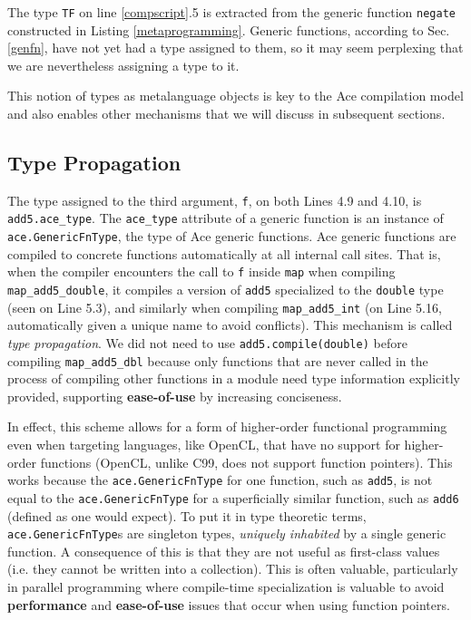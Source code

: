 \documentclass[9pt,preprint]{sigplanconf}
\begin{document}
The type \verb|TF| on line \ref{compscript}.5 is extracted from the generic function \verb|negate| constructed in Listing \ref{metaprogramming}. Generic functions, according to Sec. \ref{genfn}, have not yet had a type assigned to them, so it may seem perplexing that we are nevertheless assigning a type to it. 

This notion of types as metalanguage objects is key to the Ace compilation model and also enables other mechanisms that we will discuss in subsequent sections.

\subsection{Type Propagation}
The type assigned to the third argument, \verb|f|, on both Lines 4.9 and 4.10, is \verb|add5.ace_type|. The \verb|ace_type| attribute of a generic function is an instance of \verb|ace.GenericFnType|, the type of Ace generic functions. Ace generic functions are compiled to concrete functions automatically at all internal call sites. That is, when the compiler encounters the call to \verb|f| inside \verb|map| when compiling \verb|map_add5_double|, it compiles a version of \verb|add5| specialized to the \verb|double| type (seen on Line 5.3), and similarly when compiling \verb|map_add5_int| (on Line 5.16, automatically given a unique name to avoid conflicts). This mechanism is called {\em type propagation}. We did not need to use \verb|add5.compile(double)| before compiling \verb|map_add5_dbl| because only functions that are never called in the process of compiling other functions in a module need type information explicitly provided, supporting \textbf{ease-of-use} by increasing conciseness.

In effect, this scheme allows for a form of higher-order functional programming even when targeting languages, like OpenCL, that have no support for higher-order functions (OpenCL, unlike C99, does not support function pointers). This works because the \verb|ace.GenericFnType| for one function, such as \verb|add5|, is not equal to  the \verb|ace.GenericFnType| for a superficially similar function, such as \verb|add6| (defined as one would expect). To put it in type theoretic terms, \verb|ace.GenericFnType|s are singleton types, {\em uniquely inhabited} by a single generic function. A consequence of this is that they are not useful as first-class values (i.e. they cannot be written into a collection). This is often valuable, particularly in parallel programming where compile-time specialization is valuable to avoid \textbf{performance} and \textbf{ease-of-use} issues that occur when using function pointers.
\end{document}
